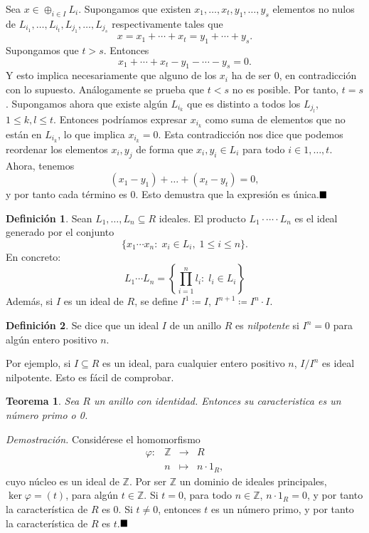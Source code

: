 \documentclass[11pt]{book}
\def\Z{\mathbb{Z}}
\def\qed{\hfill\blacksquare}
\newtheorem{theorem}{Teorema}[section]
\theoremstyle{definition}
\newtheorem{definition}{Definición}[section]
\begin{document}
Sea $x\in\oplus_{i\in I}L_i$. Supongamos que existen $x_1,\dots,x_t,y_1,\dots,y_s$ elementos no nulos de $L_{i_1},\dots,L_{i_t},L_{j_1},\dots,L_{j_s}$ respectivamente tales que\[
x=x_1+\cdots+x_t=y_1+\cdots+y_s.
\]Supongamos que $t>s$. Entonces\[
    x_1+\cdots+x_t-y_1-\cdots-y_s=0.
\]Y esto implica necesariamente que alguno de los $x_i$ ha de ser 0, en contradicción con lo supuesto. Análogamente se prueba que $t<s$ no es posible. Por tanto, $t=s$.
Supongamos ahora que existe algún $L_{i_k}$ que es distinto a todos los $L_{j_l}$, $1\leq k,l\leq t$. Entonces podríamos expresar $x_{i_k}$ como suma de elementos que no están en $L_{i_k}$, lo que implica $x_{i_k}=0$. Esta contradicción nos dice que podemos reordenar los elementos $x_i,y_j$ de forma que $x_i,y_i\in L_i$ para todo $i\in{1,\dots, t}$. Ahora, tenemos\[
(x_1-y_1)+\dots + (x_t-y_t)=0,
\]y por tanto cada término es 0. Esto demustra que la expresión es única.$\qed$
\begin{definition}
    Sean $L_1,\dots,L_n\subseteq R$ ideales. El producto $L_1\cdot\cdots\cdot L_n$ es el ideal generado por el conjunto\[
    \{x_1\cdots x_n:\; x_i\in L_i,\; 1\leq i\leq n\}.
    \]En concreto:\[
    L_1\cdots L_n=\left\{\prod_{i=1}^n l_i:\; l_i\in L_i \right\}
    \]Además, si $I$ es un ideal de $R$, se define $I^1\coloneq I$, $I^{n+1}\coloneq I^n\cdot I$.
\end{definition}
\begin{definition}
    Se dice que un ideal $I$ de un anillo $R$ es \textit{nilpotente} si $I^n=0$ para algún entero positivo $n$.
\end{definition}
Por ejemplo, si $I\subseteq R$ es un ideal, para cualquier entero positivo $n$, $I/I^n$ es ideal nilpotente. Esto es fácil de comprobar.

\begin{theorem}
    Sea $R$ un anillo con identidad. Entonces su caracteristica es un número primo o 0.
\end{theorem}
\noindent\textit{Demostración.} Considérese el homomorfismo\[
\begin{array}{rlcl}
    \varphi:&\Z &\longrightarrow &R\\
    &n &\longmapsto &n\cdot 1_R,
\end{array}
\]cuyo núcleo es un ideal de $\Z$. Por ser $\Z$ un dominio de ideales principales, $\ker\varphi=(t)$, para algún $t\in\Z$. Si $t=0$, para todo $n\in\Z$, $n\cdot 1_R=0$, y por tanto la característica de $R$ es 0. Si $t\neq 0$, entonces $t$ es un número primo, y por tanto la característica de $R$ es $t$.$\qed$
\end{document}
